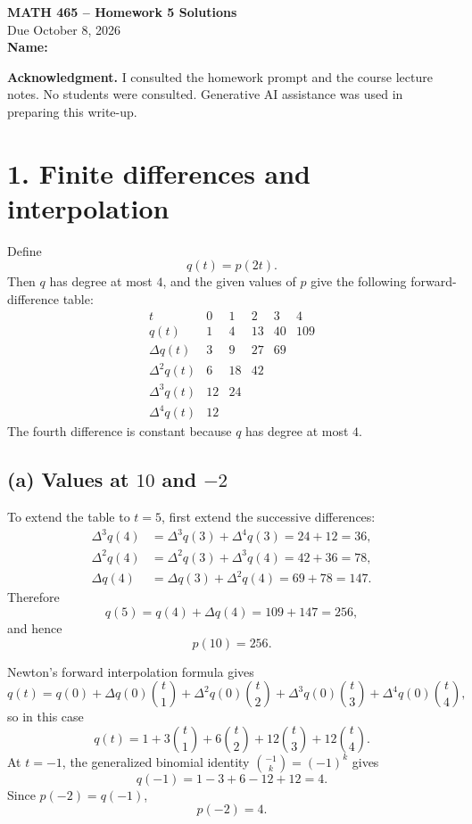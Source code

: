 \documentclass[11pt]{article}
\begin{document}
\begin{center}
    {\Large\bfseries MATH 465 -- Homework 5 Solutions}\\[4pt]
    Due October 8, 2026\\[8pt]
    \textbf{Name:} \underline{\hspace{2.5in}}
\end{center}

\textbf{Acknowledgment.} I consulted the homework prompt and the course
lecture notes. No students were consulted. Generative AI assistance was used
in preparing this write-up.

\section*{1. Finite differences and interpolation}

Define
\[
    q(t)=p(2t).
\]
Then \(q\) has degree at most \(4\), and the given values of \(p\) give the
following forward-difference table:
\[
\begin{array}{c|ccccc}
t & 0&1&2&3&4\\ \hline
q(t) & 1&4&13&40&109\\
\Delta q(t) & 3&9&27&69\\
\Delta^2q(t) & 6&18&42\\
\Delta^3q(t) & 12&24\\
\Delta^4q(t) & 12
\end{array}
\]
The fourth difference is constant because \(q\) has degree at most \(4\).

\subsection*{(a) Values at \(10\) and \(-2\)}

To extend the table to \(t=5\), first extend the successive differences:
\[
\begin{aligned}
\Delta^3q(4)&=\Delta^3q(3)+\Delta^4q(3)=24+12=36,\\
\Delta^2q(4)&=\Delta^2q(3)+\Delta^3q(4)=42+36=78,\\
\Delta q(4)&=\Delta q(3)+\Delta^2q(4)=69+78=147.
\end{aligned}
\]
Therefore
\[
    q(5)=q(4)+\Delta q(4)=109+147=256,
\]
and hence
\[
    \boxed{p(10)=256}.
\]

Newton's forward interpolation formula gives
\[
    q(t)=q(0)+\Delta q(0)\binom{t}{1}
    +\Delta^2q(0)\binom{t}{2}
    +\Delta^3q(0)\binom{t}{3}
    +\Delta^4q(0)\binom{t}{4},
\]
so in this case
\[
    q(t)=1+3\binom{t}{1}+6\binom{t}{2}
             +12\binom{t}{3}+12\binom{t}{4}.
\]
At \(t=-1\), the generalized binomial identity
\(\binom{-1}{k}=(-1)^k\) gives
\[
    q(-1)=1-3+6-12+12=4.
\]
Since \(p(-2)=q(-1)\),
\[
    \boxed{p(-2)=4}.
\]
\end{document}
